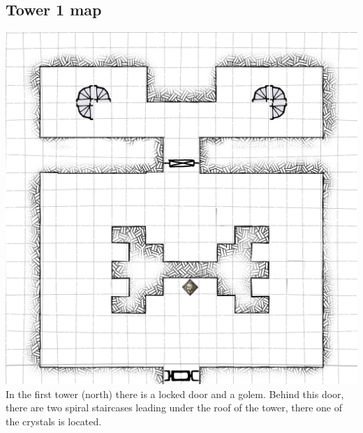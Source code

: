 \documentclass[a4paper,10pt,twoside,twocolumn,bg=print]{dndbook} %
\begin{document}
		\subsection{Tower 1 map}
		\includegraphics[width=\linewidth]{Tower1.png}
		\vspace*{4cm}\linebreak
		In the first tower (north) there is a locked door and a golem. Behind this door, there are two spiral staircases leading under the roof of the tower, there one of the crystals is located.
		\vfill
		\pagebreak
\end{document}
